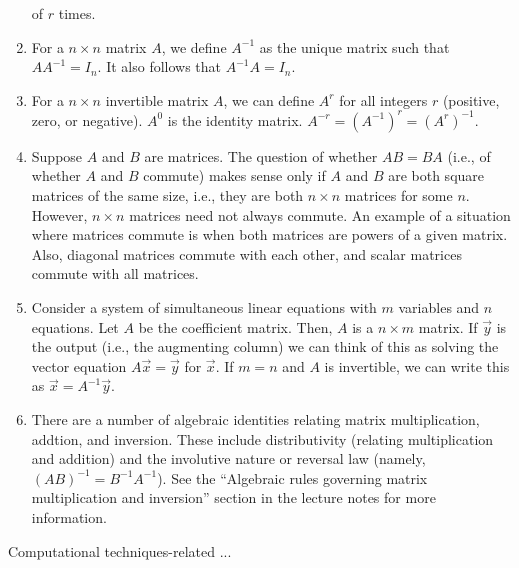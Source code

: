\documentclass[10pt]{amsart}
\begin{document}
\begin{enumerate}
  of $r$ times.
\item For a $n \times n$ matrix $A$, we define $A^{-1}$ as the unique
  matrix such that $AA^{-1} = I_n$. It also follows that $A^{-1}A =
  I_n$.
\item For a $n \times n$ invertible matrix $A$, we can define $A^r$
  for all integers $r$ (positive, zero, or negative). $A^0$ is the
  identity matrix. $A^{-r} = (A^{-1})^r = (A^r)^{-1}$.
\item Suppose $A$ and $B$ are matrices. The question of whether $AB =
  BA$ (i.e., of whether $A$ and $B$ commute) makes sense only if $A$
  and $B$ are both square matrices of the same size, i.e., they are
  both $n \times n$ matrices for some $n$. However, $n \times n$
  matrices need not always commute. An example of a situation where
  matrices commute is when both matrices are powers of a given
  matrix. Also, diagonal matrices commute with each other, and scalar
  matrices commute with all matrices.
\item Consider a system of simultaneous linear equations with $m$
  variables and $n$ equations. Let $A$ be the coefficient
  matrix. Then, $A$ is a $n \times m$ matrix. If $\vec{y}$ is the
  output (i.e., the augmenting column) we can think of this as solving
  the vector equation $A\vec{x} = \vec{y}$ for $\vec{x}$. If $m = n$
  and $A$ is invertible, we can write this as $\vec{x} =
  A^{-1}\vec{y}$.
\item There are a number of algebraic identities relating matrix
  multiplication, addtion, and inversion. These include distributivity
  (relating multiplication and addition) and the involutive nature or
  reversal law (namely, $(AB)^{-1} = B^{-1}A^{-1}$). See the
  ``Algebraic rules governing matrix multiplication and inversion''
  section in the lecture notes for more information.
\end{enumerate}

Computational techniques-related ...
\end{document}
